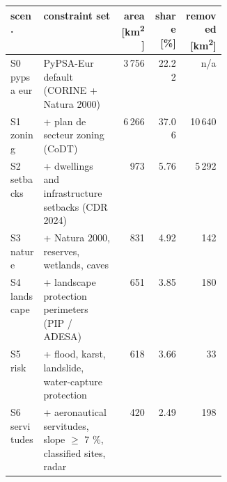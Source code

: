 \begin{tabular}{lp{0.36\linewidth}rrr}
\toprule
scen. & constraint set & area [\si{\square\kilo\metre}] & share [\%] & removed [\si{\square\kilo\metre}] \\
\midrule
S0 pypsa eur & PyPSA-Eur default (CORINE + Natura 2000) & 3\,756 & 22.22 & n/a \\
S1 zoning & + plan de secteur zoning (CoDT) & 6\,266 & 37.06 & 10\,640 \\
S2 setbacks & + dwellings and infrastructure setbacks (CDR 2024) & 973 & 5.76 & 5\,292 \\
S3 nature & + Natura 2000, reserves, wetlands, caves & 831 & 4.92 & 142 \\
S4 landscape & + landscape protection perimeters (PIP / ADESA) & 651 & 3.85 & 180 \\
S5 risk & + flood, karst, landslide, water-capture protection & 618 & 3.66 & 33 \\
S6 servitudes & + aeronautical servitudes, slope $\geq$ 7 \%, classified sites, radar & 420 & 2.49 & 198 \\
\bottomrule
\end{tabular}
